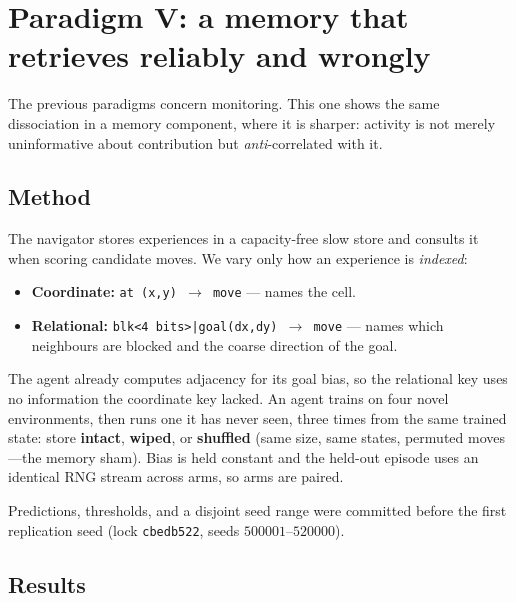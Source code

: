 \documentclass[11pt]{article}
\begin{document}
\section{Paradigm V: a memory that retrieves reliably and wrongly}
\label{sec:memory}

The previous paradigms concern monitoring. This one shows the same
dissociation in a memory component, where it is sharper: activity is not
merely uninformative about contribution but \emph{anti}-correlated with it.

\subsection{Method}

The navigator stores experiences in a capacity-free slow store and consults it
when scoring candidate moves. We vary only how an experience is \emph{indexed}:

\begin{itemize}\itemsep1pt
\item \textbf{Coordinate:} \texttt{at (x,y) $\to$ move} --- names the cell.
\item \textbf{Relational:} \texttt{blk<4 bits>|goal(dx,dy) $\to$ move} --- names
which neighbours are blocked and the coarse direction of the goal.
\end{itemize}

The agent already computes adjacency for its goal bias, so the relational key
uses no information the coordinate key lacked. An agent trains on four novel
environments, then runs one it has never seen, three times from the same
trained state: store \textbf{intact}, \textbf{wiped}, or \textbf{shuffled}
(same size, same states, permuted moves---the memory sham). Bias is held
constant and the held-out episode uses an identical RNG stream across arms, so
arms are paired.

Predictions, thresholds, and a disjoint seed range were committed before the
first replication seed (lock \texttt{cbedb522}, seeds $500001$--$520000$).

\subsection{Results}
\end{document}
